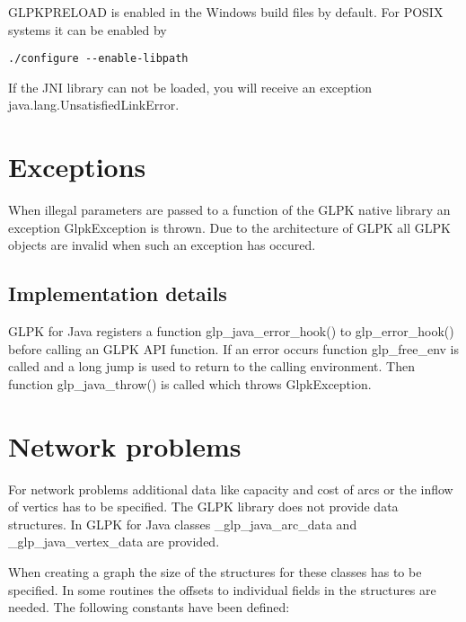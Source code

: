\documentclass[a4paper,11pt]{report}
\begin{document}
GLPKPRELOAD is enabled in the Windows build files by default.
For POSIX systems it can be enabled by

\begin{lstlisting}
./configure --enable-libpath
\end{lstlisting}

If the JNI library can not be loaded, you will receive an exception
\linebreak java.lang.UnsatisfiedLinkError.

\section{Exceptions}
When illegal parameters are passed to a function of the GLPK native library
an exception GlpkException is thrown. Due to the architecture of GLPK all
GLPK objects are invalid when such an exception has occured.

\subsection{Implementation details}
GLPK for Java registers a function glp\_java\_error\_hook() to glp\_error\_hook()
before calling an GLPK API function. If an error occurs function glp\_free\_env
is called and a long jump is used to return to the calling environment. Then
function glp\_java\_throw() is called which throws GlpkException.

\section{Network problems}
For network problems additional data like capacity and cost of arcs or the
inflow of vertics has to be specified. The GLPK library does not provide
data structures. In GLPK for Java classes \_glp\_java\_arc\_data and
\_glp\_java\_vertex\_data are provided.

When creating a graph the size of the structures for these classes has to be
specified. In some routines the offsets to individual fields in the structures are
needed. The following constants have been defined:
\end{document}
